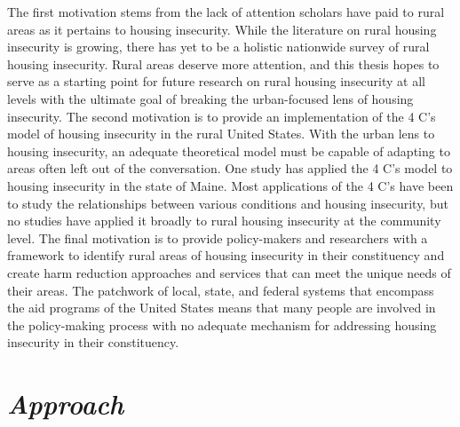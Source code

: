 The first motivation stems from the lack of attention scholars have paid to rural areas as it pertains to housing insecurity. While the literature on rural housing insecurity is growing, there has yet to be a holistic nationwide survey of rural housing insecurity. Rural areas deserve more attention, and this thesis hopes to serve as a starting point for future research on rural housing insecurity at all levels with the ultimate goal of breaking the urban-focused lens of housing insecurity. The second motivation is to provide an implementation of the 4 C's model of housing insecurity in the rural United States. With the urban lens to housing insecurity, an adequate theoretical model must be capable of adapting to areas often left out of the conversation. One study \citep{gleason_using_2021} has applied the 4 C's model to housing insecurity in the state of Maine. Most applications of the 4 C's have been to study the relationships between various conditions and housing insecurity, but no studies have applied it broadly to rural housing insecurity at the community level. The final motivation is to provide policy-makers and researchers with a framework to identify rural areas of housing insecurity in their constituency and create harm reduction approaches and services that can meet the unique needs of their areas. The patchwork of local, state, and federal systems that encompass the aid programs of the United States means that many people are involved in the policy-making process with no adequate mechanism for addressing housing insecurity in their constituency.

\section{\textit{Approach}}

